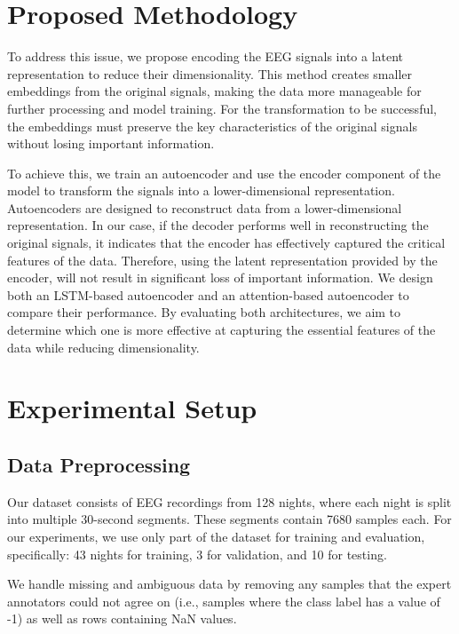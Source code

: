\section{Proposed Methodology}

To address this issue, we propose encoding the EEG signals into a latent representation to reduce their dimensionality. This method creates smaller embeddings from the original signals, making the data more manageable for further processing and model training. For the transformation to be successful, the embeddings must preserve the key characteristics of the original signals without losing important information.

To achieve this, we train an autoencoder and use the encoder component of the model to transform the signals into a lower-dimensional representation. Autoencoders are designed to reconstruct data from a lower-dimensional representation. In our case, if the decoder performs well in reconstructing the original signals, it indicates that the encoder has effectively captured the critical features of the data. Therefore, using the latent representation provided by the encoder, will not result in significant loss of important information. We design both an LSTM-based autoencoder and an attention-based autoencoder to compare their performance. By evaluating both architectures, we aim to determine which one is more effective at capturing the essential features of the data while reducing dimensionality.

\section{Experimental Setup}

\subsection{Data Preprocessing}

Our dataset consists of EEG recordings from 128 nights, where each night is split into multiple 30-second segments. These segments contain 7680 samples each. For our experiments, we use only part of the dataset for training and evaluation, specifically: 43 nights for training, 3 for validation, and 10 for testing.

We handle missing and ambiguous data by removing any samples that the expert annotators could not agree on (i.e., samples where the class label has a value of -1) as well as rows containing NaN values.

